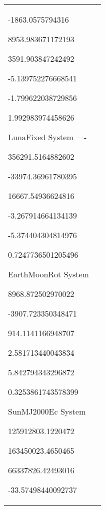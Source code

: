 \begin{table}[htbp!]
\begin{tabular}{|p{1.0 in} |p{5.0 in} |}
\begin{compactenum}
              \begin{compactenum}
                     \item -1863.0575794316
                     \item 8953.983671172193
                     \item 3591.903847242492
                     \item -5.139752276668541
                     \item -1.799622038729856
                     \item 1.992983974458626
             \end{compactenum}
              \item   LunaFixed System ----
              \begin{compactenum}
                     \item 356291.5164882602
                     \item -33974.36961780395
                     \item 16667.54936624816
                     \item -3.267914664134139
                     \item -5.374404304814976
                     \item 0.7247736501205496
              \end{compactenum}
              \item   EarthMoonRot System
              \begin{compactenum}
                     \item 8968.872502970022
                     \item -3907.723350348471
                     \item 914.1141166948707
                     \item 2.581713440043834
                     \item 5.842794343296872
                     \item 0.3253861743578399
              \end{compactenum}
              \item    SunMJ2000Ec System
               \begin{compactenum}
                     \item 125912803.1220472
                     \item 163450023.4650465
                     \item 66337826.42493016
                     \item -33.57498440092737

\end{compactenum}
\end{compactenum}
\end{tabular}
\end{table}
